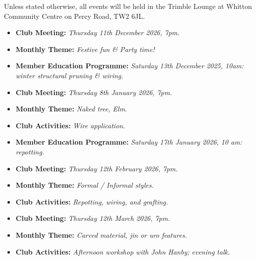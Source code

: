 \label{2025-11-themes}
\noindent
Unless stated otherwise, all events will be held in the Trimble Lounge at Whitton Community Centre on Percy Road, TW2 6JL.

\begin{itemize}
    \item \textbf{Club Meeting:} \textit{Thursday 11th December 2026, 7pm.}
    \item \textbf{Monthly Theme:} \textit{Festive fun \& Party time!}
    \item \textbf{Member Education Programme:} \textit{Saturday 13th December 2025, 10am: winter structural pruning \& wiring.}
\end{itemize}

\begin{itemize}
    \item \textbf{Club Meeting:} \textit{Thursday 8th January 2026, 7pm.}
    \item \textbf{Monthly Theme:} \textit{Naked tree, Elm.}
    \item \textbf{Club Activities:} \textit{Wire application.}
    \item \textbf{Member Education Programme:} \textit{Saturday 17th January 2026, 10 am: repotting.}
\end{itemize}

\begin{itemize}
    \item \textbf{Club Meeting:} \textit{Thursday 12th February 2026, 7pm.}
    \item \textbf{Monthly Theme:} \textit{Formal / Informal styles.}
    \item \textbf{Club Activities:} \textit{Repotting, wiring, and grafting.}
\end{itemize}

\begin{itemize}
    \item \textbf{Club Meeting:} \textit{Thursday 12th March 2026, 7pm.}
    \item \textbf{Monthly Theme:} \textit{Carved material, jin or uro features.}
    \item \textbf{Club Activities:} \textit{Afternoon workshop with John Hanby; evening talk.}
\end{itemize}

